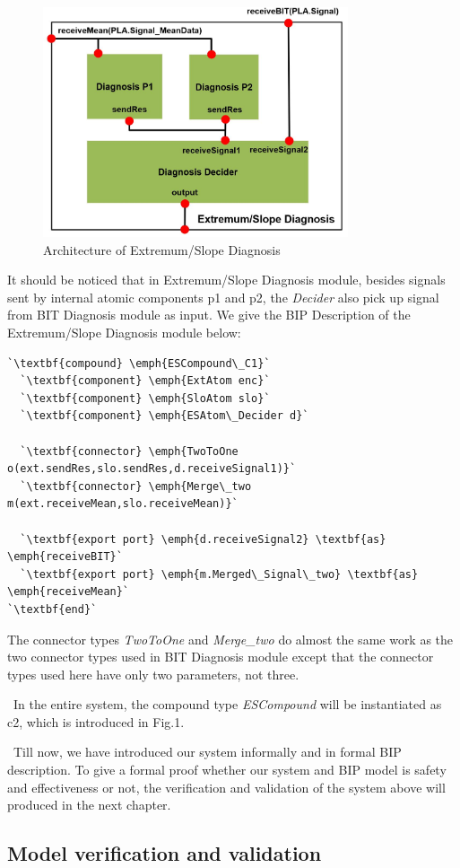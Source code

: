 \begin{figure}[ht!]
	\centering
	\includegraphics[width=90mm]{figure/figure8.jpg}
	\caption{Architecture of Extremum/Slope Diagnosis}
	\label{Ext/Slo_module}
\end{figure}

It should be noticed that in Extremum/Slope Diagnosis module, besides signals sent by internal atomic components p1 and p2, the \emph{Decider} also pick up signal from BIT Diagnosis module as input. We give the BIP Description of the Extremum/Slope Diagnosis module below:

\begin{lstlisting}
`\textbf{compound} \emph{ESCompound\_C1}`
  `\textbf{component} \emph{ExtAtom enc}`
  `\textbf{component} \emph{SloAtom slo}`
  `\textbf{component} \emph{ESAtom\_Decider d}`

  `\textbf{connector} \emph{TwoToOne o(ext.sendRes,slo.sendRes,d.receiveSignal1)}`
  `\textbf{connector} \emph{Merge\_two m(ext.receiveMean,slo.receiveMean)}`

  `\textbf{export port} \emph{d.receiveSignal2} \textbf{as} \emph{receiveBIT}`
  `\textbf{export port} \emph{m.Merged\_Signal\_two} \textbf{as} \emph{receiveMean}`
`\textbf{end}`
\end{lstlisting}

The connector types \emph{TwoToOne} and \emph{Merge\_two} do almost the same work as the two connector types used in BIT Diagnosis module except that the connector types used here have only two parameters, not three.

\ 
In the entire system, the compound type \emph{ESCompound} will be instantiated as c2, which is introduced in Fig.1.

\ 
Till now, we have introduced our system informally and in formal BIP description. To give a formal proof whether our system and BIP model is safety and effectiveness or not, the verification and validation of the system above will produced in the next chapter.
\subsection{Model verification and validation}

